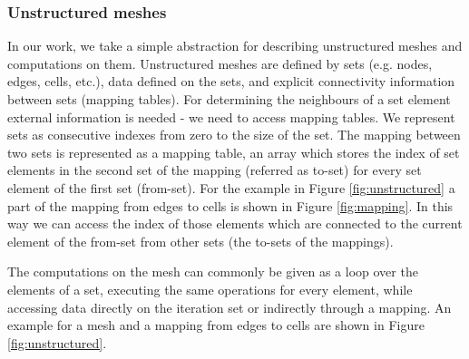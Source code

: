 \subsubsection{Unstructured meshes}\label{unstructured-meshes}


In our work, we take a simple abstraction for describing unstructured meshes and computations on them. Unstructured meshes are defined by sets (e.g. nodes, edges, cells, etc.), data defined on the sets, and explicit connectivity information between sets (mapping tables). For determining the neighbours of a set element external information is needed - we need to access mapping tables. We represent sets as consecutive indexes from zero to the size of the set. The mapping between two sets is represented as a mapping table, an array which stores the index of set elements in the second set of the
mapping (referred as to-set) for every set element of the first set (from-set).
For the example in Figure \ref{fig:unstructured} a part of the mapping from
edges to cells is shown in Figure \ref{fig:mapping}. In this way we can access
the index of those elements which are connected to the current element of the
from-set from other sets (the to-sets of the mappings).

The computations on the mesh can commonly be given as a loop over the elements of a set, executing the same operations for every element, while accessing data directly on the iteration set or indirectly through a mapping. An example for a mesh and a mapping from
edges to cells are shown in Figure \ref{fig:unstructured}.


